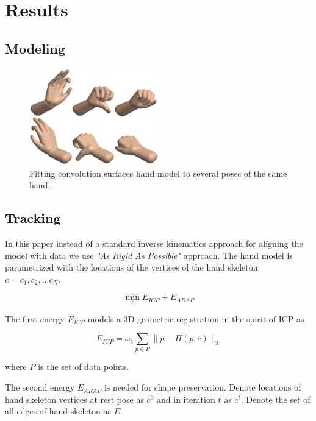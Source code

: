 \section{Results}

\subsection{Modeling}

\begin{figure}[h!] 
	\centering
	\includegraphics[width=0.5\textwidth]{figures/modeling}
	\caption{Fitting convolution surfaces hand model to several poses of the same hand.}
	\label{fig:modeling}
\end{figure}

\subsection{Tracking}

In this paper instead of a standard inverse kinematics approach for aligning the model with data we use \textit{"As Rigid As Possible"} approach. The hand model is parametrized with the locations of the vertices of the hand skeleton $c = {c_1, c_2, ... c_N}$.

\begin{equation}
	\min_{c} E_{ICP} + E_{ARAP} \label{eq:tracking_energy}
\end{equation}

The first energy $E_{ICP}$ models a 3D geometric registration in the spirit of ICP as

\begin{equation}
	E_{ICP} = \omega_1 \sum_{p \in P} \| p - \Pi(p, c)\|_2
\end{equation}

where $P$ is the set of data points.

The second energy $E_{ARAP}$ is needed for shape preservation. Denote locations of hand skeleton vertices at rest pose as $c^0$ and in iteration $t$ as $c^t$. Denote the set of all edges of hand skeleton as $E$.

